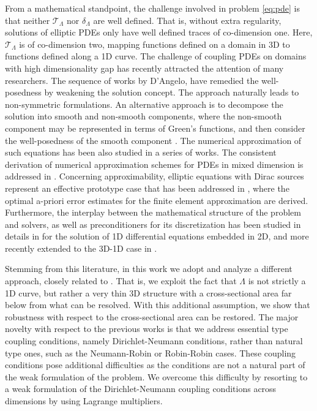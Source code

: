\documentclass[r]{siamart171218}
\begin{document}
From a mathematical standpoint, the challenge involved in problem \eqref{eq:pde} is that neither $\mathcal{T}_\Lambda$ nor $\delta_\Lambda$ are well defined. That is, without extra regularity,  solutions of elliptic PDEs only have well defined traces of co-dimension one. Here, $\mathcal{T}_\Lambda$ is of co-dimension two, mapping functions defined on a domain in 3D to functions defined along a 1D curve. 
The challenge of coupling PDEs on domains with high dimensionality gap has recently attracted the attention of many researchers. The sequence of works by D'Angelo, \cite{DAngelo,d2012finite,d2008coupling} have remedied the well-posedness by weakening the solution concept. The approach naturally leads to non-symmetric formulations. An alternative approach is to decompose the solution into smooth and non-smooth components, where the non-smooth component may be represented in terms of Green's functions, and then consider the well-posedness of the smooth component \cite{gjerde2019singularity}. The numerical approximation of such equations has been also studied in a series of works. The consistent derivation of numerical approximation schemes for PDEs in mixed dimension is addressed in \cite{Nordbotten}. Concerning approximability,  elliptic equations with Dirac sources represent an effective prototype case that has been addressed in \cite{Bertoluzza201897,koppl2016local,koppl2014optimal}, where the optimal a-priori error estimates for the finite element approximation are derived. Furthermore, the interplay between the mathematical structure of the problem and solvers, as well as preconditioners for its discretization has been studied in details  in \cite{kuchta2016preconditioners} for the solution of 1D differential equations embedded in 2D, and more recently extended to the 3D-1D case in \cite{KMM2}.

Stemming from this literature, in this work we adopt and analyze a different approach, closely related to \cite{KVWZ,laurino_m2an}. That is, we exploit the fact that $\Lambda$ is not strictly a 1D curve, but rather a very thin 3D structure with a cross-sectional area far below from what can be resolved. With this additional assumption, we show that robustness with respect to the cross-sectional area can be restored. The major novelty with respect to the previous works is that we address essential type coupling conditions, namely Dirichlet-Neumann conditions, rather than natural type ones, such as the Neumann-Robin or Robin-Robin cases. These coupling conditions pose additional difficulties as the conditions 
are not a natural part of the weak formulation of the problem. We overcome this difficulty by  resorting to a weak formulation of the Dirichlet-Neumann coupling conditions across dimensions by using Lagrange multipliers.
\end{document}

